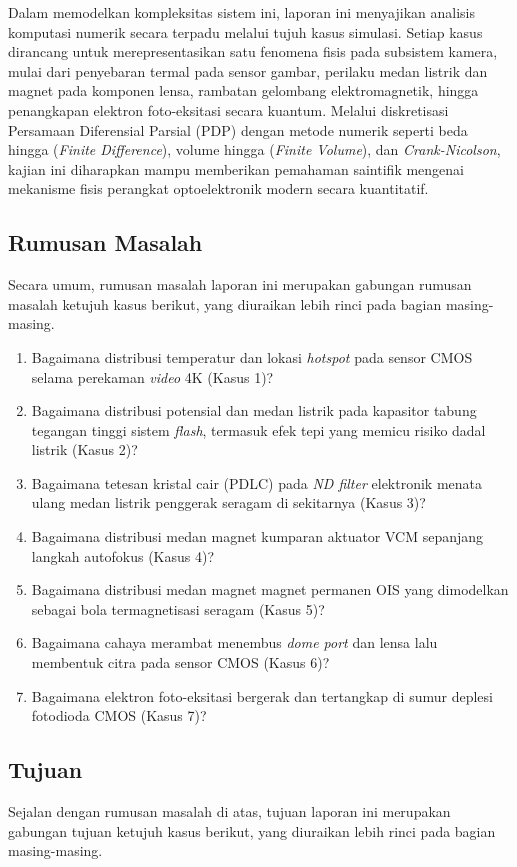\documentclass[11pt,a4paper]{article}
\begin{document}
Dalam memodelkan kompleksitas sistem ini, laporan ini menyajikan analisis komputasi numerik secara terpadu melalui tujuh kasus simulasi. Setiap kasus dirancang untuk merepresentasikan satu fenomena fisis pada subsistem kamera, mulai dari penyebaran termal pada sensor gambar, perilaku medan listrik dan magnet pada komponen lensa, rambatan gelombang elektromagnetik, hingga penangkapan elektron foto-eksitasi secara kuantum. Melalui diskretisasi Persamaan Diferensial Parsial (PDP) dengan metode numerik seperti beda hingga (\textit{Finite Difference}), volume hingga (\textit{Finite Volume}), dan \textit{Crank-Nicolson}, kajian ini diharapkan mampu memberikan pemahaman saintifik mengenai mekanisme fisis perangkat optoelektronik modern secara kuantitatif.


\subsection{Rumusan Masalah}
Secara umum, rumusan masalah laporan ini merupakan gabungan rumusan masalah ketujuh kasus berikut, yang diuraikan lebih rinci pada bagian masing-masing.

\begin{enumerate}[itemsep=1pt,topsep=2pt]
\item Bagaimana distribusi temperatur dan lokasi \textit{hotspot} pada sensor CMOS selama perekaman \textit{video} 4K (Kasus 1)?
\item Bagaimana distribusi potensial dan medan listrik pada kapasitor tabung tegangan tinggi sistem \textit{flash}, termasuk efek tepi yang memicu risiko dadal listrik (Kasus 2)?
\item Bagaimana tetesan kristal cair (PDLC) pada \textit{ND filter} elektronik menata ulang medan listrik penggerak seragam di sekitarnya (Kasus 3)?
\item Bagaimana distribusi medan magnet kumparan aktuator VCM sepanjang langkah autofokus (Kasus 4)?
\item Bagaimana distribusi medan magnet magnet permanen OIS yang dimodelkan sebagai bola termagnetisasi seragam (Kasus 5)?
\item Bagaimana cahaya merambat menembus \textit{dome port} dan lensa lalu membentuk citra pada sensor CMOS (Kasus 6)?
\item Bagaimana elektron foto-eksitasi bergerak dan tertangkap di sumur deplesi fotodioda CMOS (Kasus 7)?
\end{enumerate}

\subsection{Tujuan}
Sejalan dengan rumusan masalah di atas, tujuan laporan ini merupakan gabungan tujuan ketujuh kasus berikut, yang diuraikan lebih rinci pada bagian masing-masing.
\end{document}
